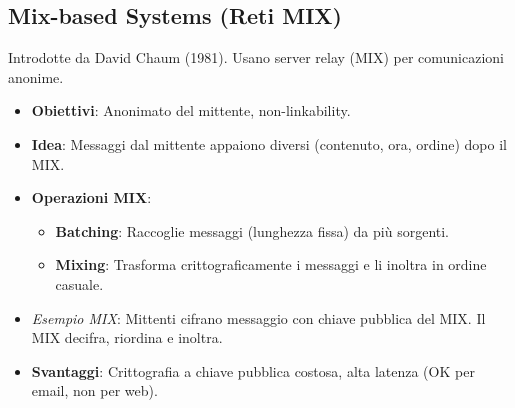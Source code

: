 \subsection{Mix-based Systems (Reti MIX)}
Introdotte da David Chaum (1981). Usano server relay (MIX) per comunicazioni anonime.
\begin{itemize}
    \item \textbf{Obiettivi}: Anonimato del mittente, non-linkability.
    \item \textbf{Idea}: Messaggi dal mittente appaiono diversi (contenuto, ora, ordine) dopo il MIX.
    \item \textbf{Operazioni MIX}:
        \begin{itemize}
            \item \textbf{Batching}: Raccoglie messaggi (lunghezza fissa) da più sorgenti.
            \item \textbf{Mixing}: Trasforma crittograficamente i messaggi e li inoltra in ordine casuale.
        \end{itemize}
    \item \textit{Esempio MIX}: Mittenti cifrano messaggio con chiave pubblica del MIX. Il MIX decifra, riordina e inoltra.
    \item \textbf{Svantaggi}: Crittografia a chiave pubblica costosa, alta latenza (OK per email, non per web).
\end{itemize}

